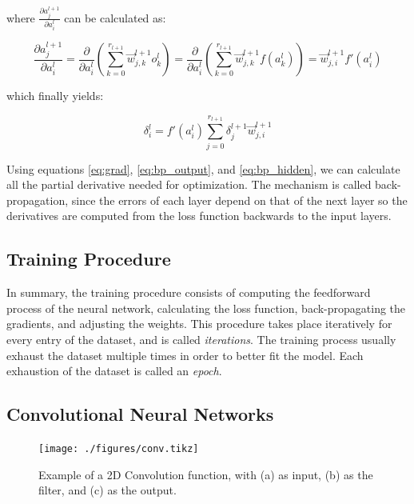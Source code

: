 \documentclass[12pt,a4paper,]{report}
\begin{document}
where \(\frac{\partial a^{l+1}_j}{\partial a^{l}_i}\) can be calculated
as:

\begin{equation}
    \frac{\partial a^{l+1}_j}{\partial a^{l}_i}
    = \frac{\partial}{\partial a^{l}_i} (\sum_{k=0}^{r_{l+1}} \vec{w}^{l+1}_{j, k} o^{l}_k)
    = \frac{\partial}{\partial a^{l}_i} (\sum_{k=0}^{r_{l+1}} \vec{w}^{l+1}_{j, k} f(a^{l}_k))
    = \vec{w}^{l+1}_{j, i} f'(a^{l}_i)
\end{equation}

which finally yields:

\begin{equation}
\delta^l_i = f'(a^{l}_i) \sum_{j=0}^{r_{l+1}} \delta^{l+1}_j \vec{w}^{l+1}_{j, i}  \label{eq:bp_hidden}
\end{equation}

Using equations \ref{eq:grad}, \ref{eq:bp_output}, and
\ref{eq:bp_hidden}, we can calculate all the partial derivative needed
for optimization. The mechanism is called back-propagation, since the
errors of each layer depend on that of the next layer so the derivatives
are computed from the loss function backwards to the input layers.

\hypertarget{training-procedure}{%
\subsection{Training Procedure}\label{training-procedure}}

In summary, the training procedure consists of computing the feedforward
process of the neural network, calculating the loss function,
back-propagating the gradients, and adjusting the weights. This
procedure takes place iteratively for every entry of the dataset, and is
called \emph{iterations}. The training process usually exhaust the
dataset multiple times in order to better fit the model. Each exhaustion
of the dataset is called an \emph{epoch}.

\hypertarget{convolutional-neural-networks}{%
\subsection{Convolutional Neural
Networks}\label{convolutional-neural-networks}}

\begin{figure}[h]
    \texttt{[image: ./figures/conv.tikz]}
    \centering
    \caption{Example of a 2D Convolution function, with (a) as input, (b) as the filter, and (c) as the output.} \label{fig:conv}
\end{figure}
\end{document}
